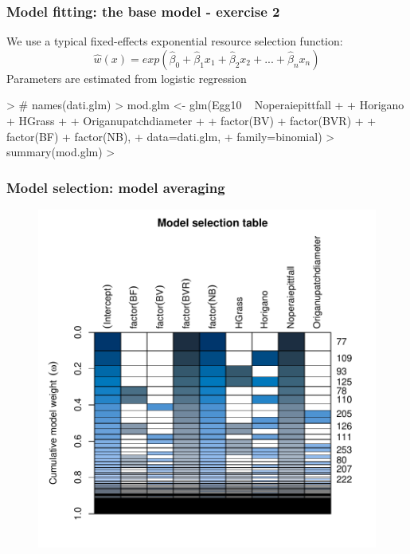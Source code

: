 \documentclass[10pt]{beamer}
\begin{document}
\begin{frame}[fragile]
\frametitle{Model fitting: the base model - exercise 2}


We use a typical fixed-effects exponential resource selection function:
$$ \hat{w}(x) = exp(\hat{\beta}_0 + \hat{\beta}_1 x_1 + \hat{\beta}_2 x_2 + ... + \hat{\beta}_n x_n) $$ 
Parameters are estimated from logistic regression

\begin{Schunk}
\begin{Sinput}
> # names(dati.glm)
> mod.glm <- glm(Egg10 ~ Noperaiepittfall + 
+                  Horigano + HGrass + 
+                  Origanupatchdiameter + 
+                  factor(BV) + factor(BVR) + 
+                  factor(BF) + factor(NB),
+                data=dati.glm,
+                family=binomial)
> summary(mod.glm)
> 
\end{Sinput}
\end{Schunk}



\end{frame}



\begin{frame}[fragile]
\frametitle{Model selection: model averaging}


\begin{figure}
\includegraphics[height=0.8\textheight,keepaspectratio=false]{pictures/Rplot-glm-modelselectionplot.pdf}
\end{figure}

\end{frame}
\end{document}
